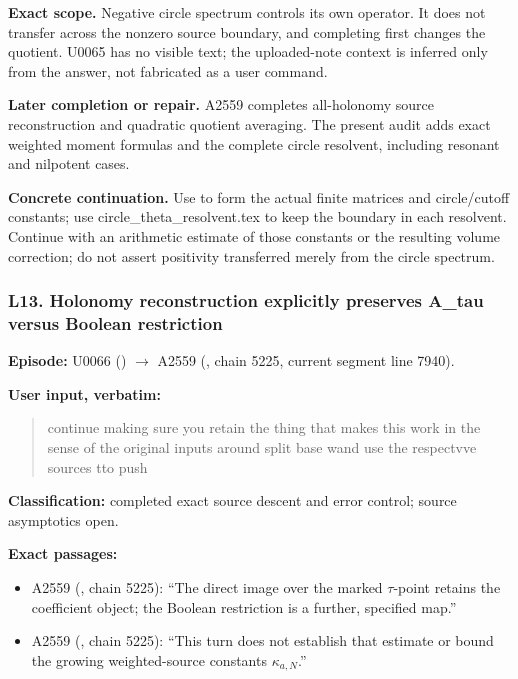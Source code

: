 \textbf{Exact scope.} Negative circle spectrum controls its own
operator. It does not transfer across the nonzero source boundary, and
completing first changes the quotient. U0065 has no visible text; the
uploaded-note context is inferred only from the answer, not fabricated
as a user command.

\textbf{Later completion or repair.} A2559 completes all-holonomy source
reconstruction and quadratic quotient averaging. The present audit adds
exact weighted moment formulas and the complete circle resolvent,
including resonant and nilpotent cases.

\textbf{Concrete continuation.} Use
\protect{} to form the actual
finite matrices and circle/cutoff constants; use
circle\_theta\_resolvent.tex to keep the boundary in each resolvent.
Continue with an arithmetic estimate of those constants or the resulting
volume correction; do not assert positivity transferred merely from the
circle spectrum.

\subsubsection{L13. Holonomy reconstruction explicitly preserves A\_tau
versus Boolean
restriction}\label{l13.-holonomy-reconstruction-explicitly-preserves-a_tau-versus-boolean-restriction}

\textbf{Episode:} U0066
(\protect{})
\allowbreak{}\ensuremath{→}\allowbreak{} A2559
(\protect{}, chain 5225,
current segment line 7940).

\textbf{User input, verbatim:}

\begin{quote}
continue making sure you retain the thing that makes this work in the
sense of the original inputs around split base wand use the respectvve
sources tto push
\end{quote}

\textbf{Classification:} completed exact source descent and error
control; source asymptotics open.

\textbf{Exact passages:}

\begin{itemize}
\tightlist
\item
  A2559 (\protect{}, chain
  5225): ``The direct image over the marked \(\tau\)-point retains the
  coefficient object; the Boolean restriction is a further, specified
  map.''
\item
  A2559 (\protect{}, chain
  5225): ``This turn does not establish that estimate or bound the
  growing weighted-source constants \(\kappa_{a,N}\).''
\end{itemize}

